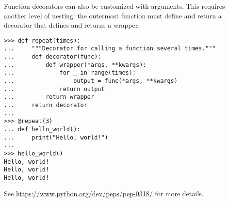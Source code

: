 Function decorators can also be customized with arguments.
This requires another level of nesting: the outermost function must define and return a decorator that defines and returns a wrapper.

\begin{lstlisting}
>>> def repeat(times):
...     """Decorator for calling a function several times."""
...     def decorator(func):
...         def wrapper(*args, **kwargs):
...             for _ in range(times):
...                 output = func(*args, **kwargs)
...             return output
...         return wrapper
...     return decorator
...
>>> @repeat(3)
... def hello_world():
...     print("Hello, world!")
...
>>> hello_world()
Hello, world!
Hello, world!
Hello, world!
\end{lstlisting}

See \url{https://www.python.org/dev/peps/pep-0318/} for more details.

\begin{comment} %
Decorating a function can overwrite the original function's docstring.
To remedy this problem, the \li{functools} module includes a decorator for wrappers.

\begin{lstlisting}
>>> from functools import wraps

>>> def typewriter(func):
...     """Decorator for printing the type of output a function returns"""
...     @wraps(func)                            # Add the @wraps tag.
...     def wrapper(*args, **kwargs):
...         output = func(*args, **kwargs)
...         print("output type:", type(output))
...         return output
...     return wrapper
...
>>> def repeat(times=2):
...     """Decorator for calling a function several times."""
...     def decorator(func):
...         @wraps(func)                        # Add the @wraps tag.
...         def wrapper(*args, **kwargs):
...             for _ in range(times):
...                 output = func(*args, **kwargs)
...             return output
...         return wrapper
...     return decorator
\end{lstlisting}
\end{comment}
